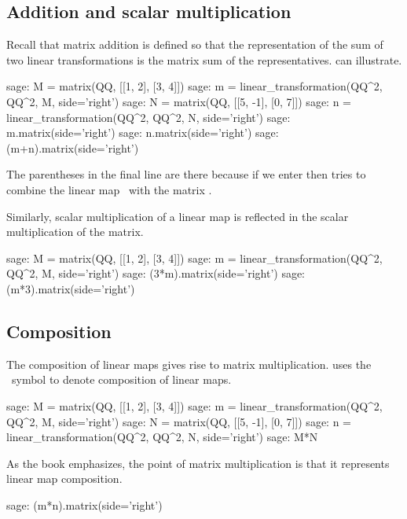 \subsection{Addition and scalar multiplication}
Recall that matrix addition is defined so that the representation of
the sum of two linear transformations is the matrix sum of the representatives.
\Sage{} can illustrate.
\begin{sagecommandline}
sage: M = matrix(QQ, [[1, 2], [3, 4]])
sage: m = linear_transformation(QQ^2, QQ^2, M, side='right')
sage: N = matrix(QQ, [[5, -1], [0, 7]])
sage: n = linear_transformation(QQ^2, QQ^2, N, side='right')
sage: m.matrix(side='right')
sage: n.matrix(side='right')
sage: (m+n).matrix(side='right')
\end{sagecommandline}
The parentheses in the final line are there because
if we enter  then \Sage{} tries to combine
the linear map~ 
with the matrix .

Similarly, scalar multiplication of a linear map is reflected in 
the scalar multiplication of the matrix.
\begin{sagecommandline}
sage: M = matrix(QQ, [[1, 2], [3, 4]])
sage: m = linear_transformation(QQ^2, QQ^2, M, side='right')
sage: (3*m).matrix(side='right')
sage: (m*3).matrix(side='right')
\end{sagecommandline}



\subsection{Composition}
The composition of linear maps gives rise to matrix multiplication.
\Sage{} uses the \inlinecode{*}~symbol to denote composition of linear maps.
\begin{sagecommandline}
sage: M = matrix(QQ, [[1, 2], [3, 4]])
sage: m = linear_transformation(QQ^2, QQ^2, M, side='right')
sage: N = matrix(QQ, [[5, -1], [0, 7]])
sage: n = linear_transformation(QQ^2, QQ^2, N, side='right')
sage: M*N
\end{sagecommandline}

As the book emphasizes, the point of matrix multiplication is that it
represents linear map composition.
\begin{sagecommandline}
sage: (m*n).matrix(side='right')
\end{sagecommandline}




\endinput


TODO:
